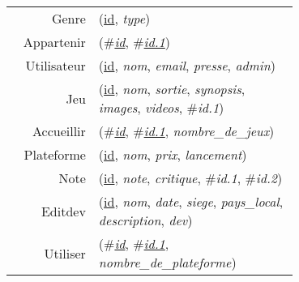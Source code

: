 
\usepackage[normalem]{ulem}
\newenvironment{mld}
  {\par\begin{minipage}{\linewidth}\begin{tabular}{rp{0.7\linewidth}}}
  {\end{tabular}\end{minipage}\par}
\newcommand{\relat}[1]{\textsc{#1}}
\newcommand{\attr}[1]{\emph{#1}}
\newcommand{\prim}[1]{\uline{#1}}
\newcommand{\foreign}[1]{\#\textsl{#1}}


\begin{mld}
  Genre & (\prim{id}, \attr{type})\\
  Appartenir & (\foreign{\prim{id}}, \foreign{\prim{id.1}})\\
  Utilisateur & (\prim{id}, \attr{nom}, \attr{email}, \attr{presse}, \attr{admin})\\
  Jeu & (\prim{id}, \attr{nom}, \attr{sortie}, \attr{synopsis}, \attr{images}, \attr{videos}, \foreign{id.1})\\
  Accueillir & (\foreign{\prim{id}}, \foreign{\prim{id.1}}, \attr{nombre\_de\_jeux})\\
  Plateforme & (\prim{id}, \attr{nom}, \attr{prix}, \attr{lancement})\\
  Note & (\prim{id}, \attr{note}, \attr{critique}, \foreign{id.1}, \foreign{id.2})\\
  Editdev & (\prim{id}, \attr{nom}, \attr{date}, \attr{siege}, \attr{pays\_local}, \attr{description}, \attr{dev})\\
  Utiliser & (\foreign{\prim{id}}, \foreign{\prim{id.1}}, \attr{nombre\_de\_plateforme})\\
\end{mld}